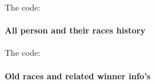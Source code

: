 \documentclass[a4paper,10pt,english]{sphinxmanual}
\begin{document}
The code:
\begin{quote}

\end{quote}


\paragraph{All person and their races history}
\label{developer/member2:all-person-and-their-races-history}\begin{quote}

\end{quote}

The code:
\begin{quote}

\end{quote}


\paragraph{Old races and related winner info's}
\label{developer/member2:old-races-and-related-winner-info-s}\begin{quote}

\end{quote}
\end{document}
